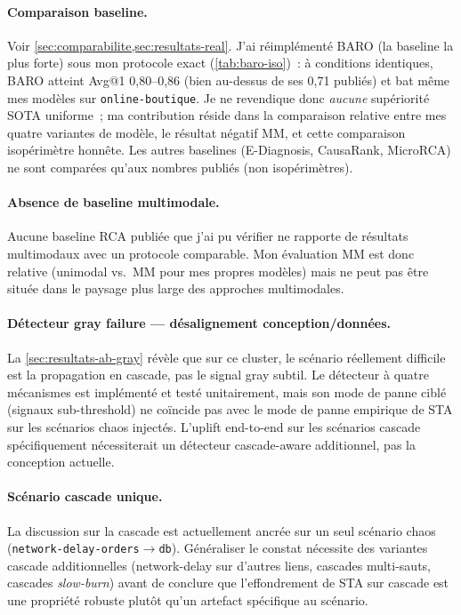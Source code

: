 \documentclass[a4paper,11pt,oneside]{report}
\begin{document}
\paragraph{Comparaison baseline.} Voir \cref{sec:comparabilite,sec:resultats-real}. J'ai r\'eimpl\'ement\'e BARO (la baseline la plus forte) sous mon protocole exact (\cref{tab:baro-iso})~: \`a conditions identiques, BARO atteint Avg@1 0,80--0,86 (bien au-dessus de ses 0,71 publi\'es) et bat m\^eme mes mod\`eles sur \texttt{online-boutique}. Je ne revendique donc \emph{aucune} sup\'eriorit\'e SOTA uniforme~; ma contribution r\'eside dans la comparaison relative entre mes quatre variantes de mod\`ele, le r\'esultat n\'egatif MM, et cette comparaison isop\'erim\`etre honn\^ete. Les autres baselines (E-Diagnosis, CausaRank, MicroRCA) ne sont compar\'ees qu'aux nombres publi\'es (non isop\'erim\`etres).

\paragraph{Absence de baseline multimodale.} Aucune baseline RCA publi\'ee que j'ai pu v\'erifier ne rapporte de r\'esultats multimodaux avec un protocole comparable. Mon \'evaluation MM est donc relative (unimodal vs.\ MM pour mes propres mod\`eles) mais ne peut pas \^etre situ\'ee dans le paysage plus large des approches multimodales.

\paragraph{D\'etecteur gray failure --- d\'esalignement conception/donn\'ees.} La \cref{sec:resultats-ab-gray} r\'ev\`ele que sur ce cluster, le sc\'enario r\'eellement difficile est la propagation en cascade, pas le signal gray subtil. Le d\'etecteur \`a quatre m\'ecanismes est impl\'ement\'e et test\'e unitairement, mais son mode de panne cibl\'e (signaux sub-threshold) ne co\"incide pas avec le mode de panne empirique de STA sur les sc\'enarios chaos inject\'es. L'uplift end-to-end sur les sc\'enarios cascade sp\'ecifiquement n\'ecessiterait un d\'etecteur cascade-aware additionnel, pas la conception actuelle.

\paragraph{Sc\'enario cascade unique.} La discussion sur la cascade est actuellement ancr\'ee sur un seul sc\'enario chaos (\texttt{network-delay-orders$\to$db}). G\'en\'eraliser le constat n\'ecessite des variantes cascade additionnelles (network-delay sur d'autres liens, cascades multi-sauts, cascades \emph{slow-burn}) avant de conclure que l'effondrement de STA sur cascade est une propri\'et\'e robuste plut\^ot qu'un artefact sp\'ecifique au sc\'enario.
\end{document}
